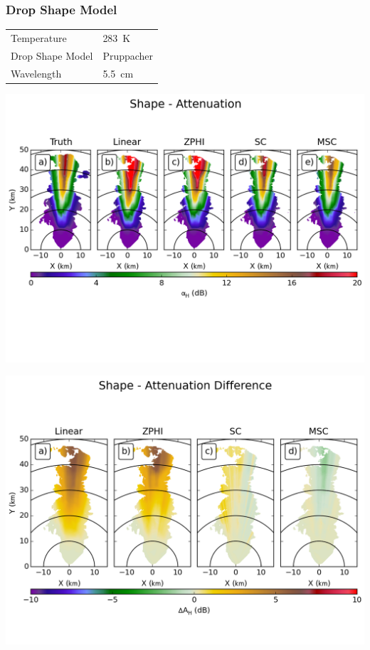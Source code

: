 \documentclass[red]{beamer}
\begin{document}
\begin{frame}
	\frametitle{Drop Shape Model}
	\begin{center}
	    \begin{tabular}{ | l | l | }
	        \hline
	        Temperature & \SI{283}{\kelvin} \\
	        Drop Shape Model & Pruppacher \\
	        Wavelength & \SI{5.5}{\centi\meter} \\
			\hline
	    \end{tabular}
	\end{center}	
\end{frame}

\begin{frame}
	\begin{center}
		\includegraphics[scale=0.55]{figures/C_Shape_Attenuation.png}
	\end{center}
\end{frame}

\begin{frame}
	\begin{center}
		\includegraphics[scale=0.45]{figures/C_Shape_Attenuation_Difference.png}
	\end{center}
\end{frame}
\end{document}
